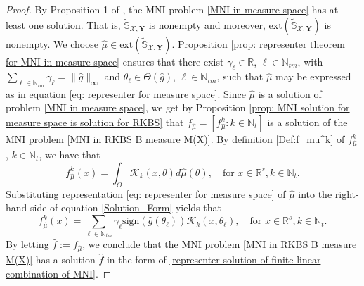 \documentclass[11pt]{article}
\begin{document}
\begin{proof}
%
By Proposition 1 of \cite{wang2021representer}, the MNI problem \eqref{MNI in measure space} has at least one solution. That is, $\widetilde{\mathbb{S}}_{\mathcal{X},\mathbf{Y}}$ is nonempty and moreover, $\mathrm{ext}\left(\widetilde{\mathbb{S}}_{\mathcal{X},\mathbf{Y}}\right)$ is nonempty. We choose $\hat \mu\in\mathrm{ext}\left(\widetilde{\mathbb{S}}_{\mathcal{X},\mathbf{Y}}\right)$. Proposition \ref{prop: representer theorem for MNI  in measure space} ensures that there exist $\gamma_\ell\in\mathbb{R}$, $\ell\in\mathbb{N}_{tm}$, with  $\sum_{\ell\in\mathbb{N}_{tm}}\gamma_\ell=\|\hat g\|_{\infty}$ and $\theta_\ell\in\Theta(\hat g)$, $\ell\in\mathbb{N}_{tm}$, such that $\hat\mu$ may be expressed as in equation \eqref{eq: representer for measure space}.
Since $\hat{\mu}$ is a solution of problem \eqref{MNI in measure space}, we get by Proposition \ref{prop: MNI solution for measure space is solution for RKBS} that $f_{\hat\mu}=[f_{\hat\mu}^k:k\in\mathbb{N}_t]$ is a solution of the MNI problem \eqref{MNI in RKBS B measure M(X)}. By definition \eqref{Def:f_mu^k} of $f_{\hat\mu}^k$, $k\in\mathbb{N}_t$, we have that 
\begin{equation}\label{Solution_Form}
f_{\hat\mu}^k(x)=\int_\Theta \mathcal{K}_k(x,\theta)d\hat{\mu}(\theta), \quad\text{for }x\in\mathbb{R}^s,  k\in\mathbb{N}_t. 
\end{equation}
Substituting representation \eqref{eq: representer for measure space} of $\hat\mu$ into the right-hand side of equation \eqref{Solution_Form} yields that 
\begin{equation*}
f_{\hat\mu}^k(x)=\sum\limits_{\ell\in\mathbb{N}_{tm}}\gamma_\ell\mathrm{sign}(\hat g(\theta_\ell))\mathcal{K}_k(x,\theta_\ell), \quad\text{for }x\in\mathbb{R}^s,  k\in\mathbb{N}_t. 
\end{equation*}
    By letting $\hat f:=f_{\hat\mu}$, we conclude that the MNI problem \eqref{MNI in RKBS B measure M(X)} has a solution $\hat f$ in the form of \eqref{representer solution of finite linear combination of MNI}. 
\end{proof}
\end{document}
